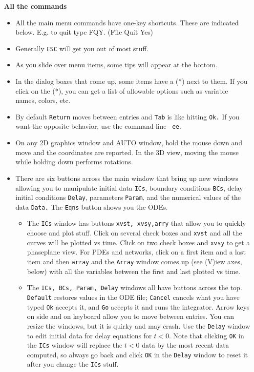 \documentclass{article}
\begin{document}
\begin{center}
{\Huge \bf All the commands }
\end{center}

\begin{itemize}
\item All the main menu commands have one-key shortcuts. These are indicated below. E.g. to quit type FQY.  (File Quit Yes)
\item Generally {\tt ESC} will get you out of most stuff. 
\item As you slide over menu items, some tips will appear at the bottom. 
\item  In the dialog boxes that come up, some items have a (*) next to them. If you click on the (*), you can get a list of allowable options such as variable names, colors, etc.
\item By default {\tt Return} moves between entries and {\tt Tab} is like hitting {\tt Ok.} If you want the opposite behavior, use the command line {\tt -ee}.  
\item On any 2D graphics window and AUTO window, hold the mouse down and move and the coordinates are reported. In the 3D view, moving the mouse while holding down performs rotations.
\item There are six buttons across the main window that bring up new windows allowing you to manipulate initial data {\tt ICs}, boundary conditions {\tt BCs}, delay initial conditions {\tt Delay}, parameters {\tt Param}, and the numerical values of the data {\tt Data.} The {\tt Eqns} button shows you the ODEs. 
\begin{itemize}
\item The {\tt ICs} window has buttons {\tt xvst, xvsy,arry} that allow you to quickly choose and plot stuff. Click on several check boxes and {\tt xvst} and all the curves will be plotted vs time. Click on two check boxes and {\tt xvsy} to get a phaseplane view. For PDEs and networks, click on a first item and a last item and then {\tt array} and the {\tt Array} window comes up (see (V)iew axes, below) with all the variables between the first and last plotted vs time.
\item The {\tt ICs, BCs, Param, Delay} windows all have buttons across the top. {\tt Default} restores values in the ODE file; {\tt Cancel} cancels what you have typed {\tt Ok} accepts it, and {\tt Go} accepts it and runs the integrator. Arrow keys on side and on keyboard allow you to move between entries. You can resize the windows, but it is quirky and may crash. Use the {\tt Delay} window to edit initial data for delay equations for $t<0.$ Note that clicking {\tt OK} in the {\tt ICs} window will replace the $t<0$ data by the most recent data computed, so always go back and click {\tt OK} in the {\tt Delay} window to reset it after you change the {\tt ICs} stuff.

\end{itemize}
\end{itemize}
\end{document}
